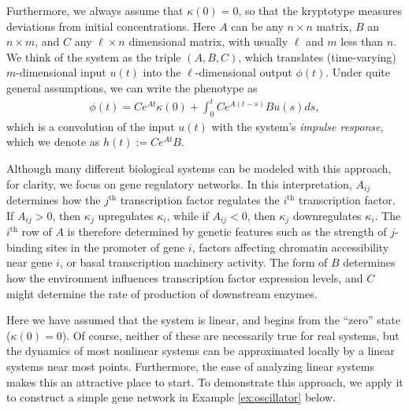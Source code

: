 \documentclass{article}
\newcommand{\1}{\mathbbm{1}}
\begin{document}
Furthermore, we always assume that $\kappa(0) = 0$,
so that the kryptotype measures deviations from initial concentrations. 
Here $A$ can be any $n \times n$ matrix, $B$ an $n \times m$, and $C$ any $\ell \times n$ dimensional matrix,
with usually $\ell$ and $m$ less than $n$.
We think of the system as the triple $(A,B,C)$,
which translates (time-varying) $m$-dimensional input $u(t)$ into the $\ell$-dimensional output $\phi(t)$.
Under quite general assumptions,
we can write the phenotype as
  \begin{align}
    \phi(t) = C e^{A t} \kappa(0) + \int_{0}^{t} C e^{A (t-s)} B u(s) ds ,
  \end{align}
which is a convolution of the input $u(t)$ with the system's \emph{impulse response},
which we denote as $h(t) := Ce^{A t}B$.

Although many different biological systems can be modeled with this approach, for clarity, we focus on gene regulatory networks.
In this interpretation, $A_{ij}$ determines how the $j^\text{th}$ transcription factor regulates the $i^\text{th}$ transcription factor.
If $A_{ij} > 0$, then $\kappa_j$ upregulates $\kappa_i$, while if $A_{ij} < 0$, then $\kappa_j$ downregulates $\kappa_i$.
The $i^\text{th}$ row of $A$ is therefore determined by genetic features such as
the strength of $j$-binding sites in the promoter of gene $i$,
factors affecting chromatin accessibility near gene $i$,
or basal transcription machinery activity.
The form of $B$ determines how the environment influences transcription factor expression levels,
and $C$ might determine the rate of production of downstream enzymes.

Here we have assumed that the system is linear,
and begins from the ``zero'' state ($\kappa(0)=0$).
Of course, neither of these are necessarily true for real systems,
but the dynamics of most nonlinear systems can be approximated locally by a linear systems near most points. 
Furthermore, the ease of analyzing linear systems makes this an attractive place to start.
To demonstrate this approach, we apply it to construct a simple gene network in Example \ref{ex:oscillator} below.
\end{document}
